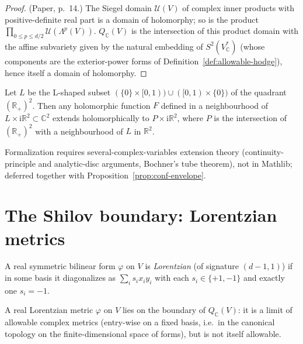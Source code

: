 \begin{proof}
  \notready
  (Paper, p.~14.) The Siegel domain $\mathcal U(V)$ of complex inner
  products with positive-definite real part is a domain of holomorphy; so is
  the product $\prod_{0 \leq p \leq d/2} \mathcal U(\Lambda^p(V))$.
  $Q_{\mathbb C}(V)$ is the intersection of this product domain with the
  affine subvariety given by the natural embedding of
  $S^2(V^*_{\mathbb C})$ (whose components are the exterior-power forms of
  Definition~\ref{def:allowable-hodge}), hence itself a domain of
  holomorphy.
\end{proof}

\begin{lemma}
  \label{lem:l-shape}
  \notready
  Let $L$ be the L-shaped subset
  $(\{0\} \times [0,1)) \cup ([0,1) \times \{0\})$ of the quadrant
  $(\mathbb R_+)^2$. Then any holomorphic function $F$ defined in a
  neighbourhood of $L \times \mathrm i \mathbb R^2 \subset \mathbb C^2$
  extends holomorphically to $P \times \mathrm i \mathbb R^2$, where $P$ is
  the intersection of $(\mathbb R_+)^2$ with a neighbourhood of $L$ in
  $\mathbb R^2$.

  Formalization requires several-complex-variables extension theory
  (continuity-principle and analytic-disc arguments, Bochner's tube
  theorem), not in Mathlib; deferred together with
  Proposition~\ref{prop:conf-envelope}.
\end{lemma}

\section{The Shilov boundary: Lorentzian metrics}

\begin{definition}
  \label{def:lorentzian}
  \leanok
  A real symmetric bilinear form $\varphi$ on $V$ is \emph{Lorentzian} (of
  signature $(d-1, 1)$) if in some basis it diagonalizes as
  $\sum_i s_i x_i y_i$ with each $s_i \in \{+1, -1\}$ and exactly one
  $s_i = -1$.
\end{definition}

\begin{proposition}
  \label{prop:lorentzian-boundary}
  \leanok
  A real Lorentzian metric $\varphi$ on $V$ lies on the boundary of
  $Q_{\mathbb C}(V)$: it is a limit of allowable complex metrics
  (entry-wise on a fixed basis, i.e.\ in the canonical topology on the
  finite-dimensional space of forms), but is not itself allowable.
\end{proposition}

